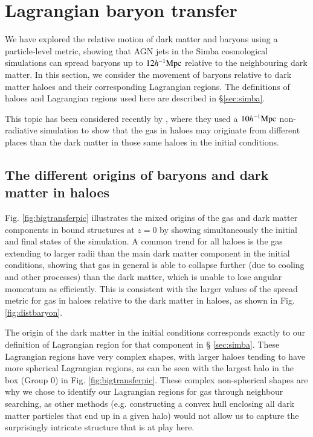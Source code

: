 \documentclass[fleqn,usenatbib]{mnras}
\newcommand{\hmpc}{h^{-1}{\rm Mpc}}
\newcommand{\simba}{{\sc Simba}}
\begin{document}
\section{Lagrangian baryon transfer}
\label{sec:transfer}

We have explored the relative motion of dark matter and baryons using a
particle-level metric, showing that AGN jets in the \simba{} cosmological
simulations can spread baryons up to $12\hmpc{}$ relative to the neighbouring
dark matter. In this section, we consider the movement of baryons relative to
dark matter haloes and their corresponding Lagrangian regions. The definitions of
haloes and Lagrangian regions used here are described in \S \ref{sec:simba}.

This topic has been considered recently by \citet{Liao2017}, where they used
a $10\hmpc{}$ non-radiative simulation to show that the gas in haloes may
originate from different places than the dark matter in those same haloes in
the initial conditions.

\subsection{The different origins of baryons and dark matter in haloes}

Fig. \ref{fig:bigtransferpic} illustrates the mixed origins of the gas and
dark matter components in bound structures at $z=0$ by showing simultaneously
the initial and final states of the simulation. A common trend for all haloes
is the gas extending to larger radii than the main dark matter component in
the initial conditions, showing that gas in general is able to collapse
further (due to cooling and other processes) than the dark matter, which is
unable to lose angular momentum as efficiently. This is consistent with the
larger values of the spread metric for gas in haloes relative to the dark
matter in haloes, as shown in Fig. \ref{fig:distbaryon}.

The origin of the dark matter in the initial conditions corresponds exactly
to our definition of Lagrangian region for that component in \S
\ref{sec:simba}. These Lagrangian regions have very complex shapes, with
larger haloes tending to have more spherical Lagrangian regions, as can be
seen with the largest halo in the box (Group 0) in Fig.
\ref{fig:bigtransferpic}. These complex non-spherical shapes are why we
chose to identify our Lagrangian regions for gas through neighbour searching,
as other methods (e.g. constructing a convex hull enclosing all dark matter
particles that end up in a given halo) would not allow us to capture the
surprisingly intricate structure that is at play here.
\end{document}
